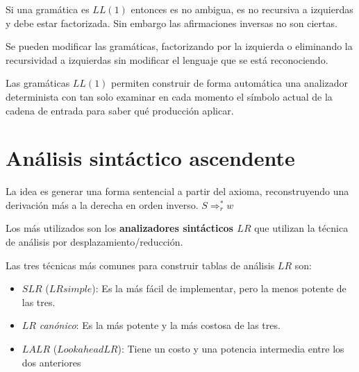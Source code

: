 Si una gramática es $LL(1)$ entonces es no ambigua, es no recursiva a izquierdas y debe estar factorizada. Sin embargo las  afirmaciones inversas no son ciertas.

Se pueden modificar las gramáticas, factorizando por la izquierda o eliminando la recursividad a izquierdas sin modificar el lenguaje que se está reconociendo.



Las gramáticas $LL(1)$ permiten construir de forma automática una analizador determinista con tan solo examinar en cada momento el símbolo actual de la cadena de entrada para saber qué producción aplicar. 

%	
	

\section{Análisis sintáctico ascendente}

La idea es generar una forma sentencial a partir del axioma, reconstruyendo una derivación más a la derecha en orden inverso. $S\Rightarrow_{r}^{*}w$

Los más utilizados son los  \textbf{analizadores sintácticos $LR$} que utilizan la técnica de análisis por desplazamiento/reducción. 

Las tres técnicas más comunes para construir tablas de análisis $LR$ son:
\begin{itemize}

\item $SLR$ ($LR simple$): Es la más fácil de implementar, pero la menos potente de las tres. 

\item $LR$ \textit{canónico}: Es la más potente y la más costosa de las tres.

\item $LALR$ ($Lookahead LR$): Tiene un costo y una potencia intermedia entre los dos anteriores

\end{itemize}

